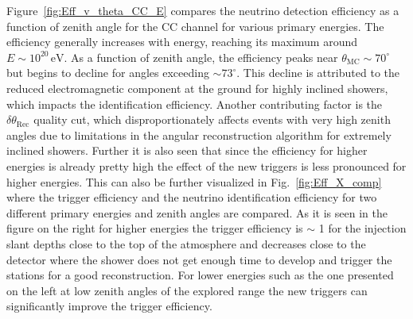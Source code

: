 Figure~\ref{fig:Eff_v_theta_CC_E} compares the neutrino detection efficiency as a function of zenith angle for the CC channel for various primary energies. The efficiency generally increases with energy, reaching its maximum around \(E \sim 10^{20}\,\mathrm{eV}\). As a function of zenith angle, the efficiency peaks near \(\theta_{\text{MC}} \sim 70^\circ\) but begins to decline for angles exceeding \(\sim 73^\circ\). This decline is attributed to the reduced electromagnetic component at the ground for highly inclined showers, which impacts the identification efficiency. Another contributing factor is the \(\delta \theta_{\text{Rec}}\) quality cut, which disproportionately affects events with very high zenith angles due to limitations in the angular reconstruction algorithm for extremely inclined showers. Further it is also seen that since the efficiency for higher energies is already pretty high the effect of the new triggers is less pronounced for higher energies. This can also be further visualized in Fig.~\ref{fig:Eff_X_comp} where the trigger efficiency and the neutrino identification efficiency for two different primary energies and zenith angles are compared. As it is seen in the figure on the right for higher energies the trigger efficiency is $\sim$ 1 for the injection slant depths close to the top of the atmosphere and decreases close to the detector where the shower does not get enough time to develop and trigger the stations for a good reconstruction. For lower energies  such as the one presented on the left at low zenith angles of the explored range the new triggers can significantly improve the trigger efficiency. 

